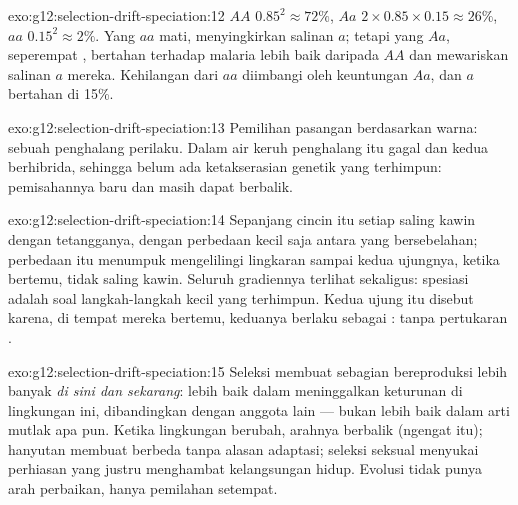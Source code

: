 \begin{solution}{exo:g12:selection-drift-speciation:12}
$AA$ $0.85^2 \approx 72\%$, $Aa$ $2 \times 0.85 \times 0.15 \approx
26\%$, $aa$ $0.15^2 \approx 2\%$. Yang $aa$ mati, menyingkirkan salinan
$a$; tetapi yang $Aa$, seperempat , bertahan terhadap malaria
lebih baik daripada $AA$ dan mewariskan salinan $a$ mereka. Kehilangan
dari $aa$ diimbangi oleh keuntungan $Aa$, dan $a$ bertahan di 15\%.
\end{solution}

\begin{solution}{exo:g12:selection-drift-speciation:13}
Pemilihan pasangan berdasarkan warna: sebuah penghalang perilaku.
Dalam air keruh penghalang itu gagal dan kedua  berhibrida,
sehingga belum ada ketakserasian genetik yang terhimpun: pemisahannya
baru dan masih dapat berbalik.
\end{solution}

\begin{solution}{exo:g12:selection-drift-speciation:14}
Sepanjang cincin itu setiap  saling kawin dengan tetangganya,
dengan perbedaan kecil saja antara yang bersebelahan; perbedaan itu
menumpuk mengelilingi lingkaran sampai kedua ujungnya, ketika bertemu,
tidak saling kawin. Seluruh gradiennya terlihat sekaligus: spesiasi
adalah soal langkah-langkah kecil yang terhimpun. Kedua ujung itu
disebut  karena, di tempat mereka bertemu, keduanya berlaku
sebagai : tanpa pertukaran .
\end{solution}

\begin{solution}{exo:g12:selection-drift-speciation:15}
Seleksi membuat  sebagian  bereproduksi lebih banyak
\emph{di sini dan sekarang}: lebih baik dalam meninggalkan keturunan
di lingkungan ini, dibandingkan dengan anggota lain  ---
bukan lebih baik dalam arti mutlak apa pun. Ketika lingkungan berubah,
arahnya berbalik (ngengat itu); hanyutan membuat  berbeda
tanpa alasan adaptasi; seleksi seksual menyukai perhiasan yang justru
menghambat kelangsungan hidup. Evolusi tidak punya arah perbaikan,
hanya pemilahan setempat.
\end{solution}

